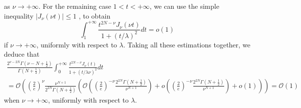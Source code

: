\documentclass[a4paper,twoside,10pt]{amsart}
\numberwithin{equation}{section}
\begin{document}
as $\nu \to +\infty$. For the remaining case $1 < t<+\infty$, we can use the simple inequality $\left| {J_\nu  \left( {\nu t} \right)} \right| \le 1$ \cite[10.14.E1]{NIST}, to obtain
\[
\int_1^{ + \infty } {\frac{{t^{2N - \nu } J_\nu  \left( {\nu t} \right)}}{{1 + \left( {t/\lambda } \right)^2 }}dt}  = o\left( 1 \right)
\]
if $\nu \to +\infty$, uniformly with respect to $\lambda$. Taking all these estimations together, we deduce that
\begin{multline*}
\frac{{2^{\nu  - 2N} \Gamma \left( {\nu  - N + \frac{1}{2}} \right)}}{{\Gamma \left( {N + \frac{1}{2}} \right)}}\int_0^{ + \infty } {\frac{{t^{2N - \nu } J_\nu  \left( t \right)}}{{1 + \left( {t/\lambda \nu } \right)^2 }}dt} \\ = \mathcal{O}\left( {\left( {\frac{2}{e}} \right)^\nu  \frac{{\nu ^{N + 1} }}{{2^{2N} \Gamma \left( {N + \frac{1}{2}} \right)}}\left( {\mathcal{O}\left( {\left( {\frac{2}{e}} \right)^{ - \nu } \frac{{2^{2N} \Gamma \left( {N + \frac{1}{2}} \right)}}{{\nu ^{N + 1} }}} \right) + o\left( {\left( {\frac{2}{e}} \right)^{ - \nu } \frac{{2^{2N} \Gamma \left( {N + \frac{1}{2}} \right)}}{{\nu ^{N + 1} }}} \right) + o\left( 1 \right)} \right)} \right) = \mathcal{O}\left( 1 \right)
\end{multline*}
when $\nu \to +\infty$, uniformly with respect to $\lambda$.
\end{document}
